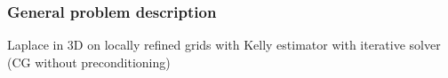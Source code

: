 \subsubsection{General problem description}
Laplace in 3D
on locally refined grids with Kelly estimator
with iterative solver (CG without preconditioning)
